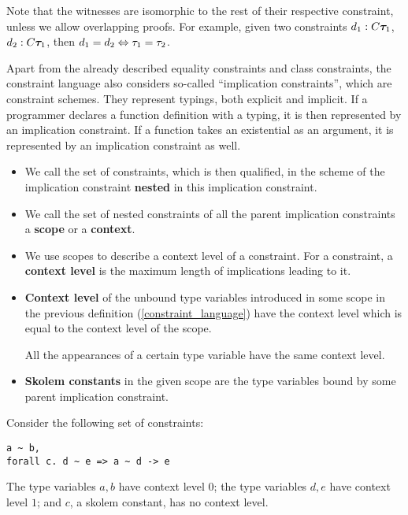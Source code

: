 \begin{remark}[Witnesses]
    Note that the witnesses are isomorphic to the rest of their respective constraint, unless we allow overlapping proofs. For example, given two constraints $d_1: C \boldsymbol{\tau}_1$, $d_2: C \boldsymbol{\tau}_1$, then $d_1 = d_2 \Leftrightarrow \tau_1 = \tau_2$.
\end{remark}

Apart from the already described equality constraints and class constraints, the constraint language also considers so-called ``implication constraints'', which are constraint schemes. They represent typings, both explicit and implicit. If a programmer declares a function definition with a typing, it is then represented by an implication constraint. If a function takes an existential as an argument, it is represented by an implication constraint as well.

\begin{defn}[Naming]
    \begin{itemize}
        \item We call the set of constraints, which is then qualified, in the scheme of the implication constraint \textbf{nested} in this implication constraint.

        \item We call the set of nested constraints of all the parent implication constraints a \textbf{scope} or a \textbf{context}.

        \item We use scopes to describe a context level of a constraint. For a constraint, a \textbf{context level} is the maximum length of implications leading to it.

        \item \textbf{Context level} of the unbound type variables introduced in some scope in the previous definition (\ref{constraint_language}) have the context level which is equal to the context level of the scope. \label{constness_level}

        All the appearances of a certain type variable have the same context level.

        \item \textbf{Skolem constants} in the given scope are the type variables bound by some parent implication constraint.
    \end{itemize}
\end{defn}

\begin{ex} Consider the following set of constraints:

    \begin{lstlisting}
a ~ b,
forall c. d ~ e => a ~ d -> e
    \end{lstlisting}
    The type variables $a, b$ have context level $0$; the type variables $d, e$ have context level $1$; and $c$, a skolem constant, has no context level.
\end{ex}

